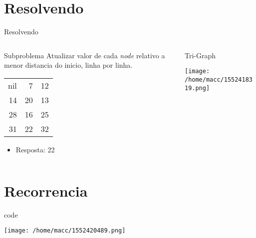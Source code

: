\documentclass[presentation]{beamer}
\begin{document}
\section{Resolvendo}
\label{sec:org92ae46d}
\begin{frame}[label={sec:org4037cf2}]{Resolvendo}
\begin{columns}
\begin{column}{0.48\columnwidth}
\begin{block}{Subproblema}
Atualizar valor de cada \emph{node} relativo a menor distancia do inicio, linha por linha.
\begin{center}
\begin{tabular}{rrr}
\hline
nil & 7 & 12\\
14 & 20 & 13\\
28 & 16 & 25\\
31 & 22 & 32\\
\hline
\end{tabular}
\end{center}

\begin{itemize}
\item Resposta: 22
\end{itemize}
\end{block}
\end{column}
\begin{column}{0.48\columnwidth}
\begin{block}{Tri-Graph}
\begin{center}
\texttt{[image: /home/macc/1552418319.png]}
\label{org929d4f0}
\end{center}
\end{block}
\end{column}
\end{columns}
\end{frame}

\section{Recorrencia}
\label{sec:org2c9d1e4}
\begin{frame}[label={sec:org942acb0}]{code}
\begin{center}
\texttt{[image: /home/macc/1552420489.png]}
\end{center}
\end{frame}
\end{document}
